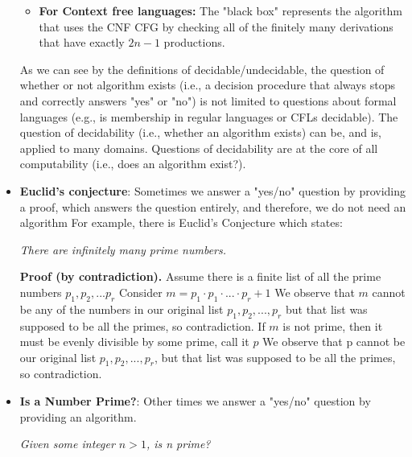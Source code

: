 \documentclass{report}
\begin{document}
\begin{itemize}
\begin{itemize}
                \item \textbf{For Context free languages:} The "black box" represents the algorithm that uses the CNF CFG by checking all of the finitely many derivations that have exactly $2n-1$ productions.
            \end{itemize}
            \bigbreak \noindent 
            As we can see by the definitions of decidable/undecidable, the question of whether or not algorithm exists (i.e., a decision procedure that always stops and correctly answers "yes" or "no") is not limited to questions about formal languages (e.g., is membership in regular languages or CFLs decidable).
            \bigbreak \noindent 
            The question of decidability (i.e., whether an algorithm exists) can be, and is, applied to many domains.
            \bigbreak \noindent 
            Questions of decidability are at the core of all computability (i.e., does an algorithm exist?).
        \item \textbf{Euclid's conjecture}: Sometimes we answer a "yes/no" question by providing a proof, which answers the question entirely, and therefore, we do not need an algorithm
            \bigbreak \noindent 
            For example, there is Euclid's Conjecture which states:
            \begin{center}
                \textit{There are infinitely many prime numbers.}
            \end{center}
            \bigbreak \noindent 
            \textbf{Proof (by contradiction).} Assume there is a finite list of all the prime numbers $p_{1}, p_{2}, ... p_{r} $
            \bigbreak \noindent 
            Consider $m= p_{1}\cdot p_{1} \cdot ... \cdot p_{r} + 1$
            \bigbreak \noindent 
            We observe that $m$ cannot be any of the numbers in our original list $p_{1},p_{2},...,p_{r}$ but that list was supposed to be all the primes, so contradiction.
            \bigbreak \noindent 
            If $m$ is not prime, then it must be evenly divisible by some prime, call it $p$
            \bigbreak \noindent 
            We observe that p cannot be our original list $p_{1},p_{2},...,p_{r}$, but that list was supposed to be all the primes, so contradiction.
        \item \textbf{Is a Number Prime?}: Other times we answer a "yes/no" question by providing an algorithm.
            \begin{center}
                \textit{Given some integer $n>1$, is n prime?}
            \end{center}

\end{itemize}
\end{document}
